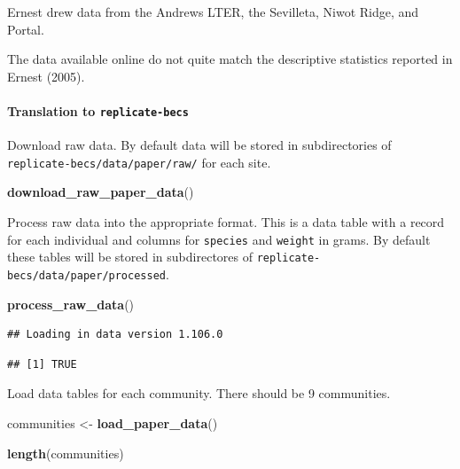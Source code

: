 \documentclass[]{article}
\newenvironment{Shaded}{\begin{snugshade}}{\end{snugshade}}
\newcommand{\KeywordTok}[1]{\textcolor[rgb]{0.13,0.29,0.53}{\textbf{#1}}}
\newcommand{\StringTok}[1]{\textcolor[rgb]{0.31,0.60,0.02}{#1}}
\newcommand{\NormalTok}[1]{#1}
\let\oldparagraph\paragraph
\renewcommand{\paragraph}[1]{\oldparagraph{#1}\mbox{}}
\begin{document}
Ernest drew data from the Andrews LTER, the Sevilleta, Niwot Ridge, and
Portal.

The data available online do not quite match the descriptive statistics
reported in Ernest (2005).

\paragraph{\texorpdfstring{Translation to
\texttt{replicate-becs}}{Translation to replicate-becs}}\label{translation-to-replicate-becs}

Download raw data. By default data will be stored in subdirectories of
\texttt{replicate-becs/data/paper/raw/} for each site.

\begin{Shaded}
\begin{Highlighting}[]
\KeywordTok{download_raw_paper_data}\NormalTok{()}
\end{Highlighting}
\end{Shaded}

Process raw data into the appropriate format. This is a data table with
a record for each individual and columns for \texttt{species} and
\texttt{weight} in grams. By default these tables will be stored in
subdirectores of \texttt{replicate-becs/data/paper/processed}.

\begin{Shaded}
\begin{Highlighting}[]
\KeywordTok{process_raw_data}\NormalTok{()}
\end{Highlighting}
\end{Shaded}

\begin{verbatim}
## Loading in data version 1.106.0
\end{verbatim}

\begin{verbatim}
## [1] TRUE
\end{verbatim}

Load data tables for each community. There should be 9 communities.

\begin{Shaded}
\begin{Highlighting}[]
\NormalTok{communities <-}\StringTok{ }\KeywordTok{load_paper_data}\NormalTok{()}

\KeywordTok{length}\NormalTok{(communities)}
\end{Highlighting}
\end{Shaded}
\end{document}
